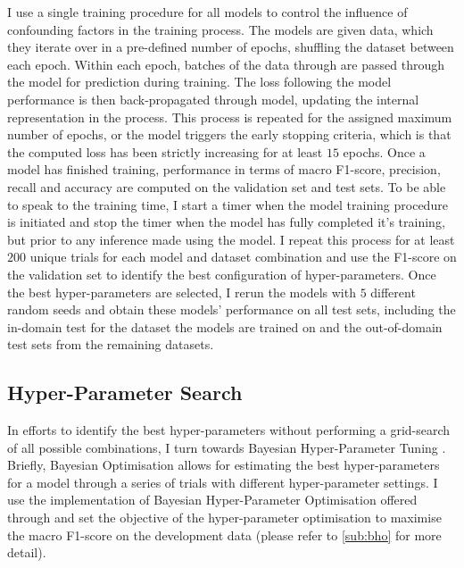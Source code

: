 I use a single training procedure for all models to control the influence of confounding factors in the training process.
The models are given data, which they iterate over in a pre-defined number of epochs, shuffling the dataset between each epoch. Within each epoch, batches of the data through are passed through the model for prediction during training.
The loss following the model performance is then back-propagated through model, updating the internal representation in the process.
This process is repeated for the assigned maximum number of epochs, or the model triggers the early stopping \citep{Early-stopping paper here} criteria, which is that the computed loss has been strictly increasing for at least $15$ epochs.
Once a model has finished training, performance in terms of macro F1-score, precision, recall and accuracy are computed on the validation set and test sets. 
To be able to speak to the training time, I start a timer when the model training procedure is initiated and stop the timer when the model has fully completed it's training, but prior to any inference made using the model.
I repeat this process for at least $200$ unique trials for each model and dataset combination and use the F1-score on the validation set to identify the best configuration of hyper-parameters.
Once the best hyper-parameters are selected, I rerun the models with $5$ different random seeds and obtain these models' performance on all test sets, including the in-domain test for the dataset the models are trained on and the out-of-domain test sets from the remaining datasets.

\subsection{Hyper-Parameter Search}\label{sub:liwc_hyperparam}

In efforts to identify the best hyper-parameters without performing a grid-search of all possible combinations, I turn towards Bayesian Hyper-Parameter Tuning \citep{Neal:1996}. Briefly, Bayesian Optimisation allows for estimating the best hyper-parameters for a model through a series of trials with different hyper-parameter settings. I use the implementation of Bayesian Hyper-Parameter Optimisation offered through \citet{Wandb} and set the objective of the hyper-parameter optimisation to maximise the macro F1-score on the development data (please refer to \cref{sub:bho} for more detail).

